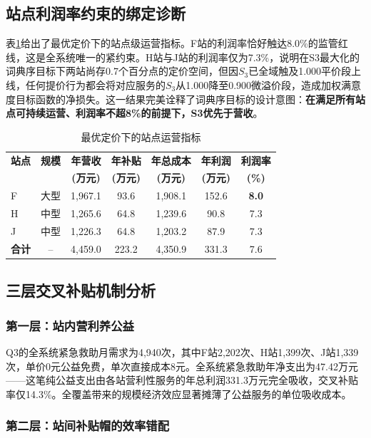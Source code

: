 \subsection{站点利润率约束的绑定诊断}

表\ref{tab:q3_stations}给出了最优定价下的站点级运营指标。F站的利润率恰好触达8.0\%的监管红线，这是全系统唯一的紧约束。H站与J站的利润率仅为7.3\%，说明在S3最大化的词典序目标下两站尚存0.7个百分点的定价空间，但因$S_3$已全域触及1.000平价段上线，任何提价行为都会将对应服务的$S_3$从1.000降至0.900微溢价段，造成加权满意度目标函数的净损失。这一结果完美诠释了词典序目标的设计意图：\textbf{在满足所有站点可持续运营、利润率不超8\%的前提下，S3优先于营收}。

\begin{table}[htbp]
\centering
\caption{最优定价下的站点运营指标}
\label{tab:q3_stations}
\small
\begin{tabular}{lcccccc}
\toprule
\textbf{站点} & \textbf{规模} & \textbf{年营收} & \textbf{年补贴} & \textbf{年总成本} & \textbf{年利润} & \textbf{利润率} \\
 &  & \textbf{(万元)} & \textbf{(万元)} & \textbf{(万元)} & \textbf{(万元)} & \textbf{(\%)} \\
\midrule
F & 大型 & 1,967.1 & 93.6 & 1,908.1 & 152.6 & \textbf{8.0} \\
H & 中型 & 1,265.6 & 64.8 & 1,239.6 & 90.8 & 7.3 \\
J & 中型 & 1,226.3 & 64.8 & 1,203.2 & 87.9 & 7.3 \\
\midrule
\textbf{合计} & -- & 4,459.0 & 223.2 & 4,350.9 & 331.3 & 7.6 \\
\bottomrule
\end{tabular}
\end{table}

\subsection{三层交叉补贴机制分析}

\subsubsection{第一层：站内营利养公益}

Q3的全系统紧急救助月需求为4,940次，其中F站2,202次、H站1,399次、J站1,339次，单价0元公益免费，单次直接成本8元。全系统紧急救助年净支出为47.42万元——这笔纯公益支出由各站营利性服务的年总利润331.3万元完全吸收，交叉补贴率仅14.3\%。全覆盖带来的规模经济效应显著摊薄了公益服务的单位吸收成本。

\subsubsection{第二层：站间补贴帽的效率错配}

